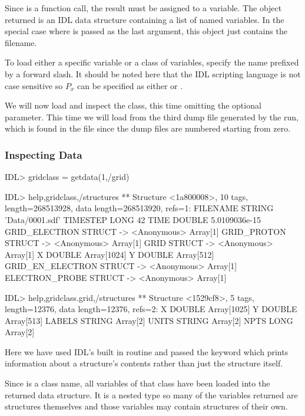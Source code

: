   Since  is a function call, the result must be assigned to a
  variable. The object returned is an IDL data structure containing a list
  of named variables. In the special case where  is passed as
  the last argument, this object just contains the filename.

  To load either a specific variable or a class of variables, specify the
  name prefixed by a forward slash. It should be noted here that the IDL
  scripting language is not case sensitive so $P_x$ can be specified as
  either  or .

  We will now load and inspect the  class, this time omitting
  the optional  parameter. This time we will load from the
  third dump file generated by the {\EPOCH} run, which is found in the
  file  since the dump files are numbered starting from zero.
%
\pagebreak
\subsubsection{Inspecting Data}

\begin{boxverbatim}
IDL> gridclass = getdata(1,/grid)

IDL> help,gridclass,/structures
** Structure <1a800008>, 10 tags, length=268513928, data length=268513920, refs=1:
   FILENAME        STRING    'Data/0001.sdf'
   TIMESTEP        LONG                42
   TIME            DOUBLE       5.0109036e-15
   GRID_ELECTRON   STRUCT    -> <Anonymous> Array[1]
   GRID_PROTON     STRUCT    -> <Anonymous> Array[1]
   GRID            STRUCT    -> <Anonymous> Array[1]
   X               DOUBLE    Array[1024]
   Y               DOUBLE    Array[512]
   GRID_EN_ELECTRON
                   STRUCT    -> <Anonymous> Array[1]
   ELECTRON_PROBE  STRUCT    -> <Anonymous> Array[1]

IDL> help,gridclass.grid,/structures
** Structure <1529cf8>, 5 tags, length=12376, data length=12376, refs=2:
   X               DOUBLE    Array[1025]
   Y               DOUBLE    Array[513]
   LABELS          STRING    Array[2]
   UNITS           STRING    Array[2]
   NPTS            LONG      Array[2]
\end{boxverbatim}

  Here we have used IDL's built in  routine and passed the
   keyword which prints information about a structure's
  contents rather than just the structure itself.

  Since  is a class name, all variables of that class have
  been loaded into the returned data structure. It is a nested type
  so many of the variables returned are structures themselves and those
  variables may contain structures of their own.

